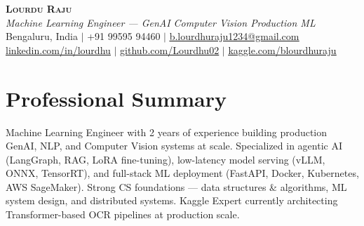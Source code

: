 \documentclass[letterpaper,11pt]{article}
\begin{document}
\begin{center}
    \textbf{\Huge \scshape Lourdu Raju} \\ \vspace{3pt}
    \small \textit{Machine Learning Engineer --- GenAI \textbar{} Computer Vision \textbar{} Production ML} \\ \vspace{4pt}
    \small Bengaluru, India $|$ +91 99595 94460 $|$
    \href{mailto:b.lourdhuraju1234@gmail.com}{\underline{b.lourdhuraju1234@gmail.com}} \\ \vspace{1pt}
    \small \href{https://linkedin.com/in/lourdhu}{\underline{linkedin.com/in/lourdhu}} $|$
    \href{https://github.com/Lourdhu02}{\underline{github.com/Lourdhu02}} $|$
    \href{https://kaggle.com/blourdhuraju}{\underline{kaggle.com/blourdhuraju}}
\end{center}

\section{Professional Summary}
Machine Learning Engineer with 2 years of experience building production GenAI, NLP, and Computer Vision systems at scale. Specialized in agentic AI (LangGraph, RAG, LoRA fine-tuning), low-latency model serving (vLLM, ONNX, TensorRT), and full-stack ML deployment (FastAPI, Docker, Kubernetes, AWS SageMaker). Strong CS foundations --- data structures \& algorithms, ML system design, and distributed systems. Kaggle Expert currently architecting Transformer-based OCR pipelines at production scale.

\end{document}

